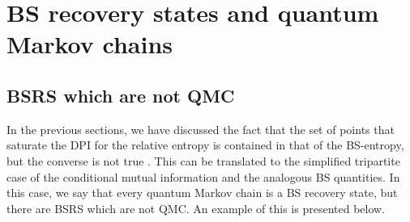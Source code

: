 \documentclass[11pt]{article}
\theoremstyle{newdefinition}
\theoremstyle{newplain}
\theoremstyle{myplain}
\DeclareMathOperator{\1}{\mathds{1}}
\begin{document}
\section{BS recovery states and quantum Markov chains}
\subsection{BSRS which are not QMC}
In the previous sections, we have discussed the fact that the set of points that saturate the DPI for the relative entropy is contained in that of the BS-entropy, but the converse is not true \cite{HiaiMosonyi-f-divergences-2017,Jencova2009}. This can be translated to the simplified tripartite case of the conditional mutual information and the analogous BS quantities. In this case, we say that every quantum Markov chain is a BS recovery state, but there are BSRS which are not QMC. An example of this is presented below.
\end{document}
